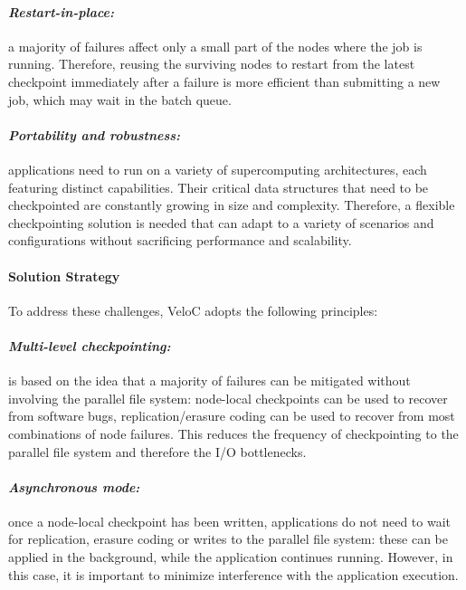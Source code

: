 \paragraph{\emph{Restart-in-place:}} a majority of failures affect
only a small part of the nodes where the job is running. Therefore,
reusing the surviving nodes to restart from the latest checkpoint
immediately after a failure is more efficient than submitting a new job,
which may wait in the batch queue.
\vspace{-1em}

\paragraph{\emph{Portability and robustness:}} applications need to
run on a variety of supercomputing architectures, each featuring
distinct capabilities. Their critical data structures that need to be
checkpointed are constantly growing in size and complexity. Therefore,
a flexible checkpointing solution is needed that can adapt to a
variety of scenarios and configurations without sacrificing
performance and scalability.

\paragraph{Solution Strategy}

To address these challenges, VeloC adopts the following principles:
\vspace{-1em}

\paragraph{\emph{Multi-level checkpointing:}} is based on the idea
that a majority of failures can be mitigated without involving the
parallel file system: node-local checkpoints can be used to recover
from software bugs, replication/erasure coding can be used to recover
from most combinations of node failures. This reduces the frequency of
checkpointing to the parallel file system and therefore the I/O
bottlenecks.
\vspace{-1em}

\paragraph{\emph{Asynchronous mode:}} once a node-local checkpoint has
been written, applications do not need to wait for replication,
erasure coding or writes to the parallel file system: these can be
applied in the background, while the application continues
running. However, in this case, it is important to minimize
interference with the application execution.
\vspace{-1em}

